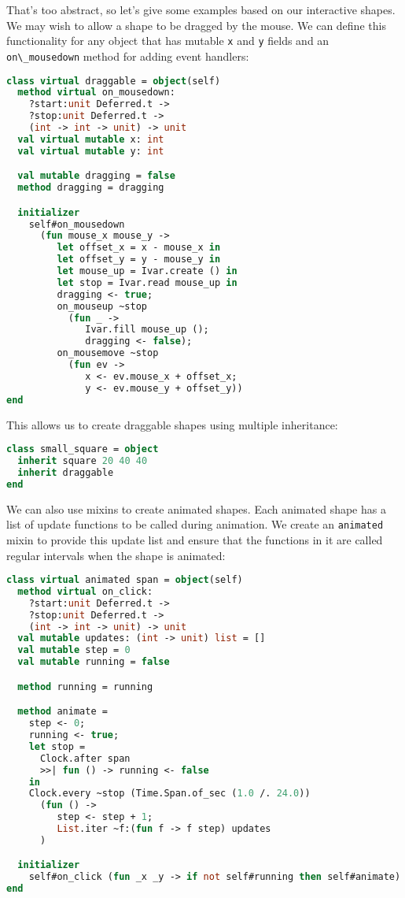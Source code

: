 That's too abstract, so let's give some examples based on our
interactive shapes. We may wish to allow a shape to be dragged by the
mouse. We can define this functionality for any object that has mutable
\passthrough{\lstinline!x!} and \passthrough{\lstinline!y!} fields and
an \passthrough{\lstinline!on\_mousedown!} method for adding event
handlers:

\begin{lstlisting}[language=Caml]
class virtual draggable = object(self)
  method virtual on_mousedown:
    ?start:unit Deferred.t ->
    ?stop:unit Deferred.t ->
    (int -> int -> unit) -> unit
  val virtual mutable x: int
  val virtual mutable y: int

  val mutable dragging = false
  method dragging = dragging

  initializer
    self#on_mousedown
      (fun mouse_x mouse_y ->
         let offset_x = x - mouse_x in
         let offset_y = y - mouse_y in
         let mouse_up = Ivar.create () in
         let stop = Ivar.read mouse_up in
         dragging <- true;
         on_mouseup ~stop
           (fun _ ->
              Ivar.fill mouse_up ();
              dragging <- false);
         on_mousemove ~stop
           (fun ev ->
              x <- ev.mouse_x + offset_x;
              y <- ev.mouse_y + offset_y))
end
\end{lstlisting}

This allows us to create draggable shapes using multiple inheritance:

\begin{lstlisting}[language=Caml]
class small_square = object
  inherit square 20 40 40
  inherit draggable
end
\end{lstlisting}

We can also use mixins to create animated shapes. Each animated shape
has a list of update functions to be called during animation. We create
an \passthrough{\lstinline!animated!} mixin to provide this update list
and ensure that the functions in it are called regular intervals when
the shape is animated: 

\begin{lstlisting}[language=Caml]
class virtual animated span = object(self)
  method virtual on_click:
    ?start:unit Deferred.t ->
    ?stop:unit Deferred.t ->
    (int -> int -> unit) -> unit
  val mutable updates: (int -> unit) list = []
  val mutable step = 0
  val mutable running = false

  method running = running

  method animate =
    step <- 0;
    running <- true;
    let stop =
      Clock.after span
      >>| fun () -> running <- false
    in
    Clock.every ~stop (Time.Span.of_sec (1.0 /. 24.0))
      (fun () ->
         step <- step + 1;
         List.iter ~f:(fun f -> f step) updates
      )

  initializer
    self#on_click (fun _x _y -> if not self#running then self#animate)
end
\end{lstlisting}

